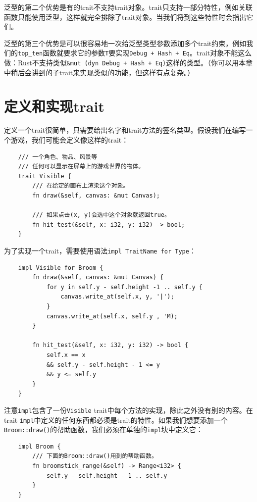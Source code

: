 泛型的第二个优势是有的trait不支持trait对象。trait只支持一部分特性，例如关联函数只能使用泛型，这样就完全排除了trait对象。当我们将到这些特性时会指出它们。

泛型的第三个优势是可以很容易地一次给泛型类型参数添加多个trait约束，例如我们的\texttt{top\_ten}函数就要求它的参数\texttt{T}要实现\texttt{Debug + Hash + Eq}。trait对象不能这么做：Rust不支持类似\texttt{\&mut (dyn Debug + Hash + Eq)}这样的类型。（你可以用本章中稍后会讲到的\hyperref[subtrait]{子trait}来实现类似的功能，但这样有点复杂。）

\section{定义和实现trait}

定义一个trait很简单，只需要给出名字和trait方法的签名类型。假设我们在编写一个游戏，我们可能会定义像这样的trait：
\begin{verbatim}
    /// 一个角色、物品、风景等
    /// 任何可以显示在屏幕上的游戏世界的物体。
    trait Visible {
        /// 在给定的画布上渲染这个对象。
        fn draw(&self, canvas: &mut Canvas);

        /// 如果点击(x, y)会选中这个对象就返回true。
        fn hit_test(&self, x: i32, y: i32) -> bool;
    }
\end{verbatim}

为了实现一个trait，需要使用语法\texttt{impl TraitName for Type}：
\begin{verbatim}
    impl Visible for Broom {
        fn draw(&self, canvas: &mut Canvas) {
            for y in self.y - self.height -1 .. self.y {
                canvas.write_at(self.x, y, '|');
            }
            canvas.write_at(self.x, self.y , 'M);
        }

        fn hit_test(&self, x: i32, y: i32) -> bool {
            self.x == x
            && self.y - self.height - 1 <= y
            && y <= self.y
        }
    }
\end{verbatim}

注意\texttt{impl}包含了一份\texttt{Visible} trait中每个方法的实现，除此之外没有别的内容。在trait \texttt{impl}中定义的任何东西都必须是trait的特性。如果我们想要添加一个\texttt{Broom::draw()}的帮助函数，我们必须在单独的\texttt{impl}块中定义它：

\begin{verbatim}
    impl Broom {
        /// 下面的Broom::draw()用到的帮助函数。
        fn broomstick_range(&self) -> Range<i32> {
            self.y - self.height - 1 .. self.y
        }
    }
\end{verbatim}

